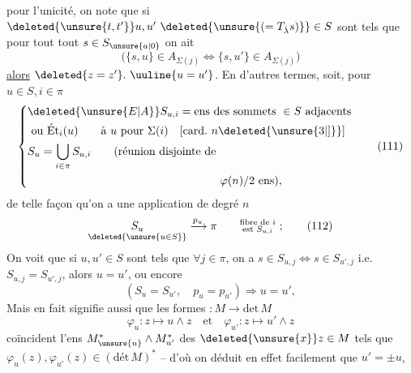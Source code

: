 pour l'unicité, on note que si $\deleted{\unsure{t,t'}}u,u'\ \deleted{\unsure{(=T_{\dot\lambda}s)}}\in S$ sont tels que pour tout tout $s\in S_{\unsure{a|0}}$  on ait
\[
\bigl(\{s,u\}\in A_{\Sigma(j)}\iff\{s,u'\}\in A_{\Sigma(j)}\bigr)
\]
\uline{alors} $\deleted{z=z'}.~\uuline{u=u'}$. En d'autres termes, soit, pour $u\in S,i\in\pi$
\[
\left\{\begin{aligned}
&\deleted{\unsure{E|A}}S_{u,i}=\text{ens des sommets }\in S\ \text{adjacents}\\
&\ \text{ou }\mathrm{\acute Et}_i(u)\qquad\text{à }u\ \text{pour }\Sigma(i)\quad[\mathrm{card}.\ n\deleted{\unsure{3|]}}]\\
&S_u=\bigcup_{i\in\pi}S_{u,i}\qquad\text{(réunion disjointe de}\\
&\hspace{17em}\varphi(n)/2\ \text{ens}), 
\end{aligned}\right.\tag*{(111)}
\]
 de telle façon qu'on a une application de degré $n$
\[
\underset{\deleted{\unsure{u\in S}}}{S_u}\xrightarrow{p_u}\pi\qquad\substack{\text{fibre de }i\\\text{est }S_{u,i}}\ ;\tag*{(112)}
\]
On voit  que si $u,u'\in S$ sont tels que $\forall j\in\pi$, on a $s\in S_{u,j}\iff s\in S_{u',j}$ i.e. $S_{u,j}=S_{u',j}$,  alors $u=u'$, ou encore
\[
(S_u=S_{u'},\quad p_u=p_{u'})\Longrightarrow u=u',\tag*{(113)}
\]
Mais en fait   signifie aussi que  les formes $:M\longrightarrow\mathrm{det}\,M$
\[
\varphi_u:z\mapsto u\wedge z\quad\text{et}\quad\varphi_{u'}:z\mapsto u'\wedge z
\]
 
coïncident   l'ens $M^*_{\unsure{u}}\wedge M^*_{u'}$ des $\deleted{\unsure{x}}z\in M$ tels que $\varphi_u(z),\varphi_{u'}(z)\in(\mathrm{dét}\,M)^*$ -- d'où on déduit en effet facilement que  $u'=\pm u$, 
